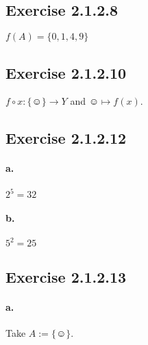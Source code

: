 \documentclass[14pt]{article}
\begin{document}
\subsection*{Exercise 2.1.2.8}
$f(A) = \{0,1,4,9\}$

\subsection*{Exercise 2.1.2.10}
$f \circ x \colon \{\smiley\} \to Y$ and $\smiley \mapsto f(x)$.

\subsection*{Exercise 2.1.2.12}
\paragraph{a.}
$2^5 = 32$
\paragraph{b.}
$5^2 = 25$

\subsection*{Exercise 2.1.2.13}
\paragraph{a.}
Take $A := \{\smiley\}$.
\end{document}
